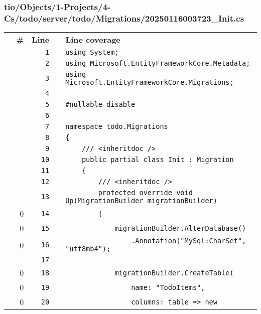 \documentclass[a4paper,landscape,10pt]{article}
\begin{document}
\subsubsection{tio/Objects/1-Projects/4-Cs/todo/server/todo/Migrations/20250116003723\_Init.cs}
\begin{longtable}[l]{lrrll}
\textbf{} & \textbf{\#} & \textbf{Line} & \textbf{} & \textbf{Line coverage}\\
\cellcolor{gray} &  & \verb~1~ & & \verb~using System;~\\
\cellcolor{gray} &  & \verb~2~ & & \verb~using Microsoft.EntityFrameworkCore.Metadata;~\\
\cellcolor{gray} &  & \verb~3~ & & \verb~using Microsoft.EntityFrameworkCore.Migrations;~\\
\cellcolor{gray} &  & \verb~4~ & & \verb~~\\
\cellcolor{gray} &  & \verb~5~ & & \verb~#nullable disable~\\
\cellcolor{gray} &  & \verb~6~ & & \verb~~\\
\cellcolor{gray} &  & \verb~7~ & & \verb~namespace todo.Migrations~\\
\cellcolor{gray} &  & \verb~8~ & & \verb~{~\\
\cellcolor{gray} &  & \verb~9~ & & \verb~    /// <inheritdoc />~\\
\cellcolor{gray} &  & \verb~10~ & & \verb~    public partial class Init : Migration~\\
\cellcolor{gray} &  & \verb~11~ & & \verb~    {~\\
\cellcolor{gray} &  & \verb~12~ & & \verb~        /// <inheritdoc />~\\
\cellcolor{gray} &  & \verb~13~ & & \verb~        protected override void Up(MigrationBuilder migrationBuilder)~\\
\cellcolor{red} & 0 & \verb~14~ & & \verb~        {~\\
\cellcolor{red} & 0 & \verb~15~ & & \verb~            migrationBuilder.AlterDatabase()~\\
\cellcolor{red} & 0 & \verb~16~ & & \verb~                .Annotation("MySql:CharSet", "utf8mb4");~\\
\cellcolor{gray} &  & \verb~17~ & & \verb~~\\
\cellcolor{red} & 0 & \verb~18~ & & \verb~            migrationBuilder.CreateTable(~\\
\cellcolor{red} & 0 & \verb~19~ & & \verb~                name: "TodoItems",~\\
\cellcolor{red} & 0 & \verb~20~ & & \verb~                columns: table => new~\\

\end{longtable}
\end{document}
